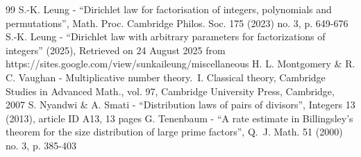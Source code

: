 \documentclass[10pt,a4paper]{amsart}
\theoremstyle{plain}
\theoremstyle{definition}
\begin{document}
\begin{thebibliography}{99}
 S.-K. Leung - “Dirichlet law for factorisation of integers, polynomials and permutations”, Math. Proc. Cambridge Philos. Soc. 175 (2023) no. 3, p. 649-676
 S.-K. Leung - “Dirichlet law with arbitrary parameters for factorizations of integers” (2025), Retrieved on 24 August 2025 from https://sites.google.com/view/sunkaileung/miscellaneous
 H. L. Montgomery \& R. C. Vaughan - Multiplicative number theory. I. Classical theory, Cambridge Studies in Advanced Math., vol. 97, Cambridge University Press, Cambridge, 2007
 S. Nyandwi \& A. Smati - “Distribution laws of pairs of divisors”, Integers 13 (2013), article ID A13, 13 pages
 G. Tenenbaum - “A rate estimate in Billingsley’s theorem for the size distribution of large prime factors”, Q. J. Math. 51 (2000) no. 3, p. 385-403
\end{thebibliography}
\end{document}
